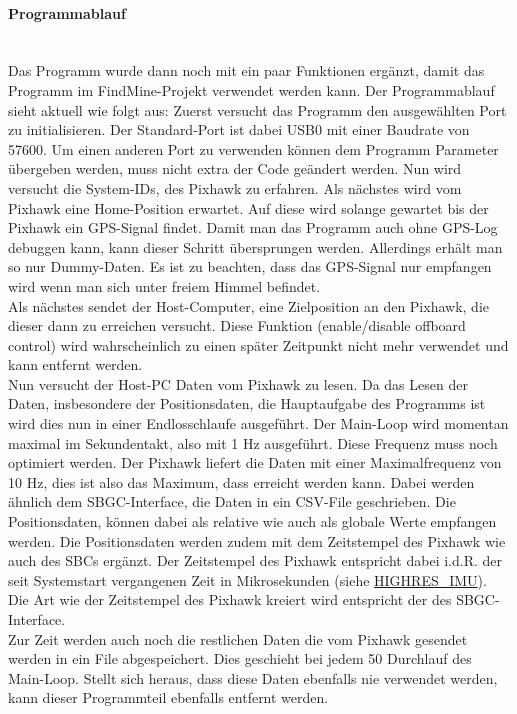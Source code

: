\documentclass[12pt]{article} %
\begin{document}
	\paragraph{Programmablauf}\ \\
	Das Programm wurde dann noch mit ein paar Funktionen ergänzt, damit das Programm im FindMine-Projekt verwendet werden kann. Der Programmablauf sieht aktuell wie folgt aus: Zuerst versucht das Programm den ausgewählten Port zu initialisieren. Der Standard-Port ist dabei USB0 mit einer Baudrate von 57600. Um einen anderen Port zu verwenden können dem Programm Parameter übergeben werden, muss nicht extra der Code geändert werden. Nun wird versucht die System-IDs, des Pixhawk zu erfahren. Als nächstes wird vom Pixhawk eine Home-Position erwartet. Auf diese wird solange gewartet bis der Pixhawk ein GPS-Signal findet. Damit man das Programm auch ohne GPS-Log debuggen kann, kann dieser Schritt übersprungen werden. Allerdings erhält man so nur Dummy-Daten. Es ist zu beachten, dass das GPS-Signal nur empfangen wird wenn man sich unter freiem Himmel befindet.\\
	Als nächstes sendet der Host-Computer, eine Zielposition an den Pixhawk, die dieser dann zu erreichen versucht. Diese Funktion (enable/disable offboard control) wird wahrscheinlich zu einen später Zeitpunkt nicht mehr verwendet und kann entfernt werden.\\
	Nun versucht der Host-PC Daten vom Pixhawk zu lesen. Da das Lesen der Daten, insbesondere der Positionsdaten, die Hauptaufgabe des Programms ist wird dies nun in einer Endlosschlaufe ausgeführt. Der Main-Loop wird momentan maximal im Sekundentakt, also mit 1 Hz ausgeführt. Diese Frequenz muss noch optimiert werden. Der Pixhawk liefert die Daten mit einer Maximalfrequenz von 10 Hz, dies ist also das Maximum, dass erreicht werden kann. Dabei werden ähnlich dem SBGC-Interface, die Daten in ein CSV-File geschrieben. Die Positionsdaten, können dabei als relative wie auch als globale Werte empfangen werden. Die Positionsdaten werden zudem mit dem Zeitstempel des Pixhawk wie auch des SBCs ergänzt. Der Zeitstempel des Pixhawk entspricht dabei i.d.R. der seit Systemstart vergangenen Zeit in Mikrosekunden (siehe \href{https://pixhawk.ethz.ch/mavlink/#HIGHRES_IMU}{HIGHRES\_IMU}). Die Art wie der Zeitstempel des Pixhawk kreiert wird entspricht der des SBGC-Interface.\\
	Zur Zeit werden auch noch die restlichen Daten die vom Pixhawk gesendet werden in ein File abgespeichert. Dies geschieht bei jedem 50 Durchlauf des Main-Loop. Stellt sich heraus, dass diese Daten ebenfalls nie verwendet werden, kann dieser Programmteil ebenfalls entfernt werden.
	
\end{document}
